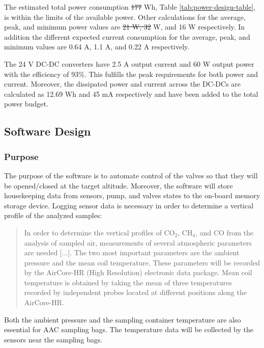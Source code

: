\documentclass[a4paper,12pt,oneside]{article} %
\providecommand{\DIFaddtex}[1]{{\protect\color{blue}\uwave{#1}}} %
\providecommand{\DIFdeltex}[1]{{\protect\color{red}\sout{#1}}}                      %
\providecommand{\DIFaddbegin}{} %
\providecommand{\DIFaddend}{} %
\providecommand{\DIFdelbegin}{} %
\providecommand{\DIFdelend}{} %
\providecommand{\DIFadd}[1]{\texorpdfstring{\DIFaddtex{#1}}{#1}} %
\providecommand{\DIFdel}[1]{\texorpdfstring{\DIFdeltex{#1}}{}} %
\newcommand{\DIFscaledelfig}{0.5}
\newlength{\DIFdelgraphicswidth} %
\newlength{\DIFdelgraphicsheight} %
\newcommand{\DIFaddincludegraphics}[2][]{{\color{blue}\fbox{\DIFOincludegraphics[#1]{#2}}}} %
\newcommand{\DIFdelincludegraphics}[2][]{%
\sbox{\DIFdelgraphicsbox}{\DIFOincludegraphics[#1]{#2}}%
\settoboxwidth{\DIFdelgraphicswidth}{\DIFdelgraphicsbox} %
\settoboxtotalheight{\DIFdelgraphicsheight}{\DIFdelgraphicsbox} %
\scalebox{\DIFscaledelfig}{%
\parbox[b]{\DIFdelgraphicswidth}{\usebox{\DIFdelgraphicsbox}\\[-\baselineskip] \rule{\DIFdelgraphicswidth}{0em}}\llap{\resizebox{\DIFdelgraphicswidth}{\DIFdelgraphicsheight}{%
\setlength{\unitlength}{\DIFdelgraphicswidth}%
\begin{picture}(1,1)%
\thicklines\linethickness{2pt} %
{\color[rgb]{1,0,0}\put(0,0){\framebox(1,1){}}}%
{\color[rgb]{1,0,0}\put(0,0){\line( 1,1){1}}}%
{\color[rgb]{1,0,0}\put(0,1){\line(1,-1){1}}}%
\end{picture}%
}\hspace*{3pt}}} %
} %
\DeclareRobustCommand{\DIFaddbegin}{\DIFOaddbegin \let\includegraphics\DIFaddincludegraphics} %
\DeclareRobustCommand{\DIFaddend}{\DIFOaddend \let\includegraphics\DIFOincludegraphics} %
\DeclareRobustCommand{\DIFdelbegin}{\DIFOdelbegin \let\includegraphics\DIFdelincludegraphics} %
\DeclareRobustCommand{\DIFdelend}{\DIFOaddend \let\includegraphics\DIFOincludegraphics} %
\begin{document}


The estimated total power consumption \DIFdelbegin \DIFdel{177 }\DIFdelend \DIFaddbegin \DIFadd{181 }\DIFaddend Wh, Table \ref{tab:power-design-table}, is within the limits of the available power. Other calculations for the average, peak, and minimum power values are \DIFdelbegin \DIFdel{21 W, 32 }\DIFdelend \DIFaddbegin \DIFadd{24 W, 38 }\DIFaddend W, and 16 W respectively. In addition the different expected current consumption for the average, peak, and minimum values are 0.64 A, 1.1 A, and 0.22 A respectively.

The 24 V DC-DC converters have 2.5 A output current and 60 W output power with the efficiency of 93\%. This fulfills the peak requirements for both power and current. Moreover, the dissipated power and current across the DC-DCs are calculated as 12.69 Wh and 45 mA respectively and have been added to the total power budget. 



\raggedbottom

\pagebreak
\subsection{Software Design}
\subsubsection{Purpose}
The purpose of the software is to automate control of the valves so that they will be opened/closed at the target altitude. Moreover, the software will store housekeeping data from sensors, pump, and valves states to the on-board memory storage device. Logging sensor data is necessary in order to determine a vertical profile of the analyzed samples:

\begin{quote}
In order to determine the vertical profiles of CO$_2$, CH$_4$, and CO from the analysis of sampled air, measurements of several atmospheric parameters are needed [...]. The two most important parameters are the ambient pressure and the mean coil temperature. These parameters will be recorded by the AirCore-HR (High Resolution) electronic data package. Mean coil temperature is obtained by taking the mean of three temperatures recorded by independent probes located at different positions along the AirCore-HR.\cite{Membrive}
\end{quote}

Both the ambient pressure and the sampling container temperature are also essential for AAC sampling bags. The temperature data will be collected by the sensors near the sampling bags.
\end{document}
